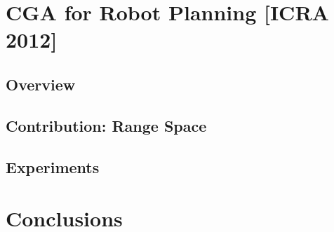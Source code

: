 \documentclass[10pt]{beamer}
\begin{document}










\section{CGA for Robot Planning [ICRA 2012]}
\subsection[Overview]{Overview}
%

%

%

%

%
%
%


\subsection[Range Space]{Contribution: Range Space}















\subsection[Experiments]{Experiments}

% 
% 
% 
% 
% 

%





\section{Conclusions}



\end{document}
